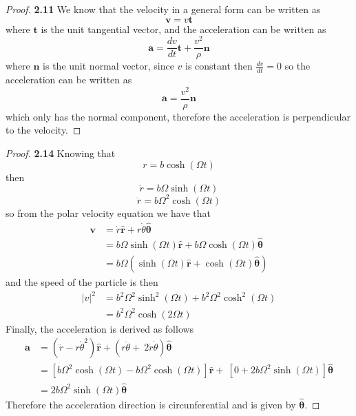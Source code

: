 \documentclass[11pt]{article}
\newcommand{\hatr}{\bm{\hat{r}}}
\newcommand{\hatth}{\bm{\hat{\theta}}}
\begin{document}
    \begin{proof}{\textbf{2.11}}
        We know that the velocity in a general form can be written as
        $$\bm{v} = v \bm{t}$$
        where $\bm{t}$ is the unit tangential vector, and the acceleration can
        be written as
        $$\bm{a} = \frac{dv}{dt}\bm{t} + \frac{v^2}{\rho}\bm{n}$$
        where $\bm{n}$ is the unit normal vector, since $v$ is constant
        then $\frac{dv}{dt}=0$ so the acceleration can be written as
        $$\bm{a} = \frac{v^2}{\rho}\bm{n}$$
        which only has the normal component, therefore the acceleration is
        perpendicular to the velocity.
    \end{proof}
    \begin{proof}{\textbf{2.14}}
        Knowing that
        $$r = b \cosh(\Omega t)$$
        then
        $$\dot{r} = b \Omega\sinh(\Omega t)$$
        $$\ddot{r} = b \Omega^2\cosh(\Omega t)$$
        so from the polar velocity equation we have that
        \begin{align*}
            \bm{v} &= \dot{r}\hatr + r\dot{\theta}\hatth \\
                   &= b \Omega\sinh(\Omega t) \hatr + b \Omega\cosh(\Omega t) \hatth \\
                   &= b \Omega(\sinh(\Omega t) \hatr + \cosh(\Omega t) \hatth) 
        \end{align*}
        and the speed of the particle is then
        \begin{align*}
            |v|^2 &= b^2\Omega^2\sinh^2(\Omega t) + b^2 \Omega^2\cosh^2(\Omega t) \\
                  &= b^2\Omega^2 \cosh(2 \Omega t)
        \end{align*}
        Finally, the acceleration is derived as follows
        \begin{align*}
            \bm{a} &= (\ddot{r} - r\dot{\theta}^2) \hatr + (r\ddot{\theta} + \ 
                    2\dot{r}\dot{\theta}) \hatth \\
                   &= [b \Omega^2\cosh(\Omega t) - b \Omega^2\cosh(\Omega t)] \hatr + \
                    [0 + 2 b \Omega^2\sinh(\Omega t)] \hatth \\
                   &= 2 b \Omega^2\sinh(\Omega t) \hatth
        \end{align*}
        Therefore the acceleration direction is circunferential and is
            given by $\hatth$.
    \end{proof}
\end{document}
